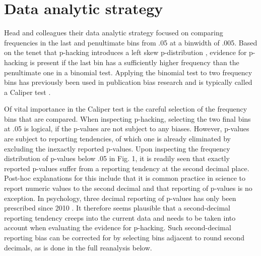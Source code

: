 \section*{Data analytic strategy}
Head and colleagues their data analytic strategy focused on comparing frequencies in the last and penultimate bins from .05 at a binwidth of .005. Based on the tenet that p-hacking introduces a left skew p-distribution \cite{Simonsohn2014}, evidence for p-hacking is present if the last bin has a sufficiently higher frequency than the penultimate one in a binomial test. Applying the binomial test to two frequency bins has previously been used in publication bias research and is typically called a Caliper test \cite{gerber2010, kuhberger2014}.

Of vital importance in the Caliper test is the careful selection of the frequency bins that are compared. When inspecting p-hacking, selecting the two final bins at .05 is logical, if the p-values are not subject to any biases. However, p-values are subject to reporting tendencies, of which one is already eliminated by excluding the inexactly reported p-values. Upon inspecting the frequency distribution of p-values below .05 in Fig. 1, it is readily seen that exactly reported p-values suffer from a reporting tendency at the second decimal place. Post-hoc explanations for this include that it is common practice in science to report numeric values to the second decimal and that reporting of p-values is no exception. In psychology, three decimal reporting of p-values has only been prescribed since 2010 \cite{AmericanPsychologicalAssociation2010}. It therefore seems plausible that a second-decimal reporting tendency creeps into the current data and needs to be taken into account when evaluating the evidence for p-hacking. Such second-decimal reporting bias can be corrected for by selecting bins adjacent to round second decimals, as is done in the full reanalysis below.
  